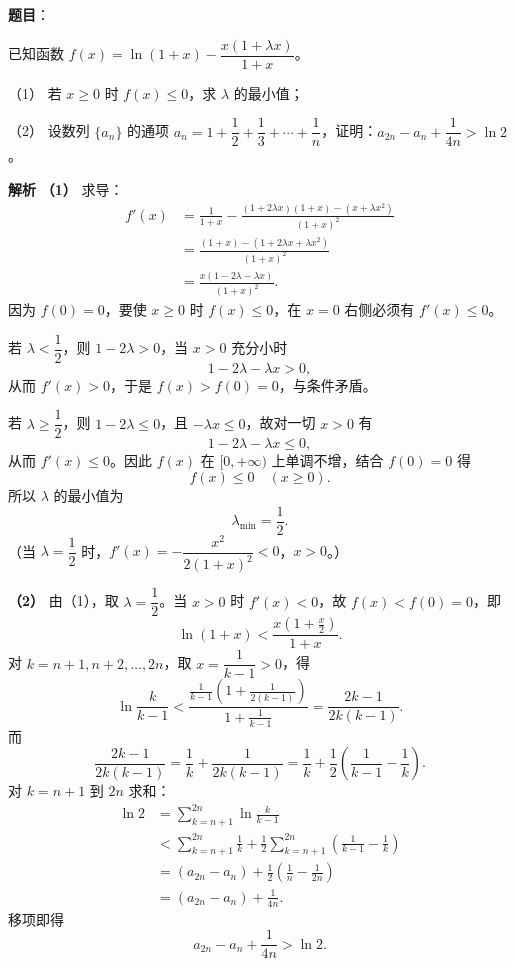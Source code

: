 \begin{answer}

\textbf{题目}：

已知函数 $f(x)=\ln(1+x)-\dfrac{x(1+\lambda x)}{1+x}$。

（1） 若 $x\geqslant0$ 时 $f(x)\leqslant0$，求 $\lambda$ 的最小值；

（2） 设数列 $\{a_n\}$ 的通项 $a_n=1+\dfrac12+\dfrac13+\cdots+\dfrac1n$，证明：$a_{2n}-a_n+\dfrac1{4n}>\ln2$。

\textbf{解析}
\textbf{（1）} 求导：
\nopagebreak[4]
\[\begin{aligned}
f'(x)&=\frac1{1+x}
-\frac{(1+2\lambda x)(1+x)-(x+\lambda x^2)}{(1+x)^2}\\
&=\frac{(1+x)-(1+2\lambda x+\lambda x^2)}{(1+x)^2}\\
&=\frac{x(1-2\lambda-\lambda x)}{(1+x)^2}.
\end{aligned}\]
因为 $f(0)=0$，要使 $x\geqslant0$ 时 $f(x)\leqslant0$，在 $x=0$ 右侧必须有 $f'(x)\leqslant0$。

若 $\lambda<\dfrac12$，则 $1-2\lambda>0$，当 $x>0$ 充分小时
\nopagebreak[4]
\[1-2\lambda-\lambda x>0,\]
从而 $f'(x)>0$，于是 $f(x)>f(0)=0$，与条件矛盾。

若 $\lambda\geqslant\dfrac12$，则 $1-2\lambda\leqslant0$，且 $-\lambda x\leqslant0$，故对一切 $x>0$ 有
\nopagebreak[4]
\[1-2\lambda-\lambda x\leqslant0,\]
从而 $f'(x)\leqslant0$。因此 $f(x)$ 在 $[0,+\infty)$ 上单调不增，结合 $f(0)=0$ 得
\nopagebreak[4]
\[f(x)\leqslant0\quad(x\geqslant0).\]
所以 $\lambda$ 的最小值为
\nopagebreak[4]
\[\lambda_{\min}=\frac12.\]
（当 $\lambda=\dfrac12$ 时，$f'(x)=-\dfrac{x^2}{2(1+x)^2}<0$，$x>0$。）

\textbf{（2）} 由（1），取 $\lambda=\dfrac12$。当 $x>0$ 时 $f'(x)<0$，故 $f(x)<f(0)=0$，即
\nopagebreak[4]
\[\ln(1+x)<\frac{x\left(1+\frac x2\right)}{1+x}.\]
对 $k=n+1,n+2,\dots,2n$，取 $x=\dfrac1{k-1}>0$，得
\nopagebreak[4]
\[\ln\frac{k}{k-1}
<\frac{\frac1{k-1}\left(1+\frac1{2(k-1)}\right)}{1+\frac1{k-1}}
=\frac{2k-1}{2k(k-1)}.\]
而
\nopagebreak[4]
\[\frac{2k-1}{2k(k-1)}
=\frac1k+\frac1{2k(k-1)}
=\frac1k+\frac12\left(\frac1{k-1}-\frac1k\right).\]
对 $k=n+1$ 到 $2n$ 求和：
\nopagebreak[4]
\[\begin{aligned}
\ln 2
&=\sum_{k=n+1}^{2n}\ln\frac{k}{k-1}\\
&<\sum_{k=n+1}^{2n}\frac1k
+\frac12\sum_{k=n+1}^{2n}\left(\frac1{k-1}-\frac1k\right)\\
&=(a_{2n}-a_n)
+\frac12\left(\frac1n-\frac1{2n}\right)\\
&=(a_{2n}-a_n)+\frac1{4n}.
\end{aligned}\]
移项即得
\nopagebreak[4]
\[a_{2n}-a_n+\frac1{4n}>\ln2.\]



\end{answer}